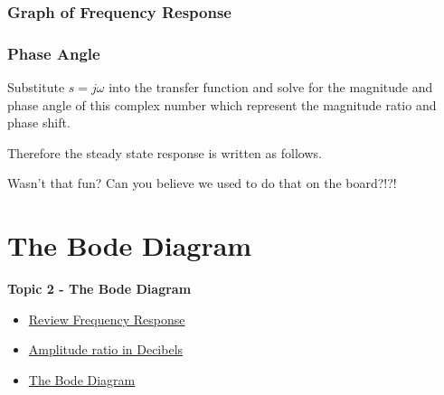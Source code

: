 \documentclass[fleqn]{beamer} %
\newcommand{\sectionIItitle}{The Bode Diagram}
\newcommand{\sectionIsubsectionIVtitle}{Graph of Frequency Response}
\newcommand{\sectionIIsubsectionItitle}{Review Frequency Response}
\newcommand{\sectionIIsubsectionIItitle}{Amplitude ratio in Decibels}
\newcommand{\sectionIIsubsectionIIItitle}{The Bode Diagram}
\newcommand{\sectionIIsubsectionIVtitle}{Frequency Response in MATLAB}
\begin{document}
			\begin{frame}
				\frametitle{\sectionIsubsectionIVtitle}
				\bigskip
				\frametitle{Phase Angle}		
				\small

				\vspc

				\vspc
				\vspcc

				Substitute $s=j\omega$ into the transfer function and solve for the magnitude and phase angle of this complex number which represent the magnitude ratio and phase shift. \vspc

				Therefore the steady state response is written as follows.  \vspc

				\vspcc

				Wasn't that fun? Can you believe we used to do that on the board?!?! \vspc

				\btVFill
			\end{frame}
	
	\section{\sectionIItitle}\label{sectionII}

		\begin{frame}
			\large \textbf{Topic 2 - \sectionIItitle} \vspace{3mm}\\

			\begin{itemize}
				\item \hyperlink{sectionIIsubsectionI}{\sectionIIsubsectionItitle} \vspc %
				\item \hyperlink{sectionIIsubsectionII}{\sectionIIsubsectionIItitle} \vspc %
				\item \hyperlink{sectionIIsubsectionIII}{\sectionIIsubsectionIIItitle} \vspc %
			\end{itemize}

		\end{frame}
\end{document}
